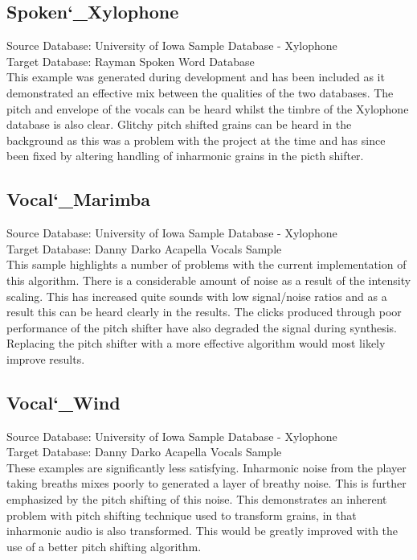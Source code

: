 \documentclass{scrartcl}
\begin{document}
    \subsection{Spoken\char`_Xylophone}
    Source Database: University of Iowa Sample Database - Xylophone\\
    Target Database: Rayman Spoken Word Database\\

    This example was generated during development and has been included as it
    demonstrated an effective mix between the qualities of the two databases.
    The pitch and envelope of the vocals can be heard whilst the timbre of the
    Xylophone database is also clear. Glitchy pitch shifted grains can be heard
    in the background as this was a problem with the project at the time and
    has since been fixed by altering handling of inharmonic grains in the
    picth shifter.

    \subsection{Vocal\char`_Marimba}
    Source Database: University of Iowa Sample Database - Xylophone\\
    Target Database: Danny Darko Acapella Vocals Sample\\
    This sample highlights a number of problems with the current implementation
    of this algorithm.
    There is a considerable amount of noise as a result of the intensity
    scaling. This has increased quite sounds with low signal/noise ratios and
    as a result this can be heard clearly in the results.
    The clicks produced through poor performance of the pitch shifter have also
    degraded the signal during synthesis. Replacing the pitch shifter with a
    more effective algorithm would most likely improve results.

    \subsection{Vocal\char`_Wind}
    Source Database: University of Iowa Sample Database - Xylophone\\
    Target Database: Danny Darko Acapella Vocals Sample\\
    These examples are significantly less satisfying. Inharmonic noise from the
    player taking breaths mixes poorly to generated a layer of breathy noise.
    This is further emphasized by the pitch shifting of this noise. This
    demonstrates an inherent problem with pitch shifting technique used to
    transform grains, in that inharmonic audio is also transformed. This would
    be greatly improved with the use of a better pitch shifting algorithm.
\end{document}
